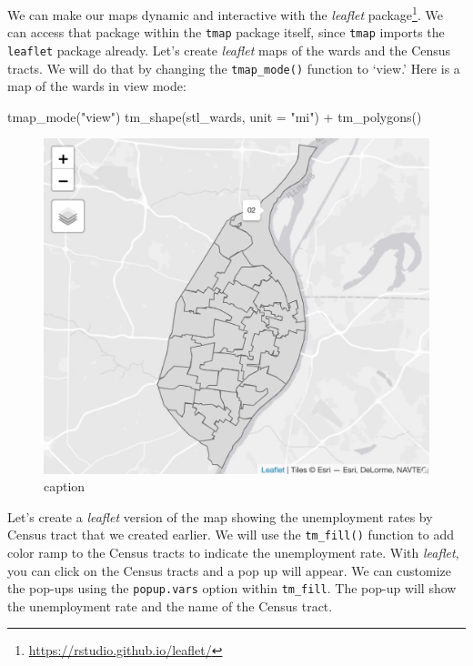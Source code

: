 \documentclass[
  krantz2]{krantz}
\makeatletter
\newenvironment{Shaded}{\begin{snugshade}}{\end{snugshade}}
\newcommand{\AttributeTok}[1]{\textcolor[rgb]{0.61,0.61,0.61}{#1}}
\newcommand{\FunctionTok}[1]{\textcolor[rgb]{0,0,0}{#1}}
\newcommand{\NormalTok}[1]{#1}
\newcommand{\SpecialCharTok}[1]{\textcolor[rgb]{0,0,0}{#1}}
\newcommand{\StringTok}[1]{\textcolor[rgb]{0.5,0.5,0.5}{#1}}
\newenvironment{kframe}{%
\medskip{}
\setlength{\fboxsep}{.8em}
 \def\at@end@of@kframe{}%
 \ifinner\ifhmode%
  \def\at@end@of@kframe{\end{minipage}}%
  \begin{minipage}{\columnwidth}%
 \fi\fi%
 \def\FrameCommand##1{\hskip\@totalleftmargin \hskip-\fboxsep
 \colorbox{shadecolor}{##1}\hskip-\fboxsep
     \hskip-\linewidth \hskip-\@totalleftmargin \hskip\columnwidth}%
 \MakeFramed {\advance\hsize-\width
   \@totalleftmargin\z@ \linewidth\hsize
   \@setminipage}}%
 {\par\unskip\endMakeFramed%
 \at@end@of@kframe}
\renewenvironment{Shaded}{\begin{kframe}}{\end{kframe}}
\makeatother
\begin{document}
We can make our maps dynamic and interactive with the \emph{leaflet} package\footnote{\url{https://rstudio.github.io/leaflet/}}. We can access that package within the \texttt{tmap} package itself, since \texttt{tmap} imports the \texttt{leaflet} package already. Let's create \emph{leaflet} maps of the wards and the Census tracts. We will do that by changing the \texttt{tmap\_mode()} function to `view.' Here is a map of the wards in view mode:

\begin{Shaded}
\begin{Highlighting}[]
\FunctionTok{tmap\_mode}\NormalTok{(}\StringTok{"view"}\NormalTok{)}
\FunctionTok{tm\_shape}\NormalTok{(stl\_wards, }\AttributeTok{unit =} \StringTok{"mi"}\NormalTok{) }\SpecialCharTok{+}
  \FunctionTok{tm\_polygons}\NormalTok{()}
\end{Highlighting}
\end{Shaded}

\begin{figure}
\centering
\includegraphics{tmap-images/code-7.png}
\caption{caption}
\end{figure}

Let's create a \emph{leaflet} version of the map showing the unemployment rates by Census tract that we created earlier. We will use the \texttt{tm\_fill()} function to add color ramp to the Census tracts to indicate the unemployment rate. With \emph{leaflet}, you can click on the Census tracts and a pop up will appear. We can customize the pop-ups using the \texttt{popup.vars} option within \texttt{tm\_fill}. The pop-up will show the unemployment rate and the name of the Census tract.
\end{document}
